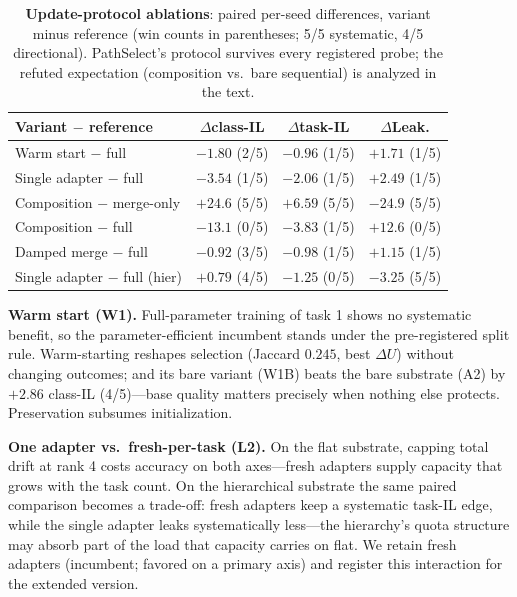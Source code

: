 \documentclass{article}
\begin{document}
\begin{table}[t]
\centering\footnotesize
\caption{\textbf{Update-protocol ablations}: paired per-seed differences, variant minus reference (win counts in parentheses; 5/5 systematic, 4/5 directional). PathSelect's protocol survives every registered probe; the refuted expectation (composition vs.\ bare sequential) is analyzed in the text.}
\label{tab:abl}
\begin{tabular}{lccc}
\toprule
Variant $-$ reference & $\Delta$class-IL & $\Delta$task-IL & $\Delta$Leak. \\
\midrule
Warm start $-$ full & $-1.80$ (2/5) & $-0.96$ (1/5) & $+1.71$ (1/5) \\
Single adapter $-$ full & $-3.54$ (1/5) & $-2.06$ (1/5) & $+2.49$ (1/5) \\
Composition $-$ merge-only & $+24.6$ (5/5) & $+6.59$ (5/5) & $-24.9$ (5/5) \\
Composition $-$ full & $-13.1$ (0/5) & $-3.83$ (1/5) & $+12.6$ (0/5) \\
Damped merge $-$ full & $-0.92$ (3/5) & $-0.98$ (1/5) & $+1.15$ (1/5) \\
Single adapter $-$ full (hier) & $+0.79$ (4/5) & $-1.25$ (0/5) & $-3.25$ (5/5) \\
\bottomrule
\end{tabular}
\end{table}

\textbf{Warm start (W1).} Full-parameter training of task 1 shows no systematic benefit, so the parameter-efficient incumbent stands under the pre-registered split rule. Warm-starting reshapes selection (Jaccard $0.245$, best $\Delta U$) without changing outcomes; and its bare variant (W1B) beats the bare substrate (A2) by $+2.86$ class-IL (4/5)---base quality matters precisely when nothing else protects. Preservation subsumes initialization.

\textbf{One adapter vs.\ fresh-per-task (L2).} On the flat substrate, capping total drift at rank 4 costs accuracy on both axes---fresh adapters supply capacity that grows with the task count. On the hierarchical substrate the same paired comparison becomes a trade-off: fresh adapters keep a systematic task-IL edge, while the single adapter leaks systematically less---the hierarchy's quota structure may absorb part of the load that capacity carries on flat. We retain fresh adapters (incumbent; favored on a primary axis) and register this interaction for the extended version.
\end{document}
